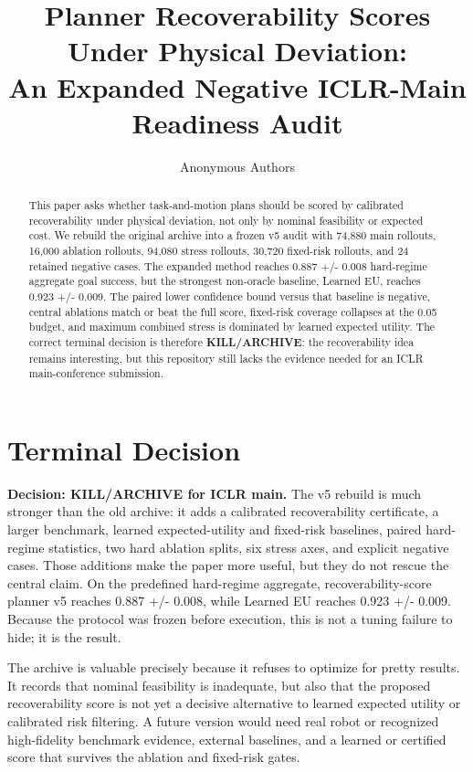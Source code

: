 \documentclass{article}
\title{Planner Recoverability Scores Under Physical Deviation:\\An Expanded Negative ICLR-Main Readiness Audit}
\author{Anonymous Authors}
\newcommand{\methodname}{recoverability-score planner v5}
\begin{document}
\maketitle

\begin{abstract}

This paper asks whether task-and-motion plans should be scored by calibrated recoverability under physical deviation, not only by nominal feasibility or expected cost. We rebuild the original archive into a frozen v5 audit with 74,880 main rollouts, 16,000 ablation rollouts, 94,080 stress rollouts, 30,720 fixed-risk rollouts, and 24 retained negative cases. The expanded method reaches 0.887 +/- 0.008 hard-regime aggregate goal success, but the strongest non-oracle baseline, Learned EU, reaches 0.923 +/- 0.009. The paired lower confidence bound versus that baseline is negative, central ablations match or beat the full score, fixed-risk coverage collapses at the 0.05 budget, and maximum combined stress is dominated by learned expected utility. The correct terminal decision is therefore \textbf{KILL/ARCHIVE}: the recoverability idea remains interesting, but this repository still lacks the evidence needed for an ICLR main-conference submission.

\end{abstract}

\section{Terminal Decision}

\textbf{Decision: KILL/ARCHIVE for ICLR main.} The v5 rebuild is much stronger than the old archive: it adds a calibrated recoverability certificate, a larger benchmark, learned expected-utility and fixed-risk baselines, paired hard-regime statistics, two hard ablation splits, six stress axes, and explicit negative cases. Those additions make the paper more useful, but they do not rescue the central claim. On the predefined hard-regime aggregate, \methodname{} reaches 0.887 +/- 0.008, while Learned EU reaches 0.923 +/- 0.009. Because the protocol was frozen before execution, this is not a tuning failure to hide; it is the result.

The archive is valuable precisely because it refuses to optimize for pretty results. It records that nominal feasibility is inadequate, but also that the proposed recoverability score is not yet a decisive alternative to learned expected utility or calibrated risk filtering. A future version would need real robot or recognized high-fidelity benchmark evidence, external baselines, and a learned or certified score that survives the ablation and fixed-risk gates.
\end{document}
